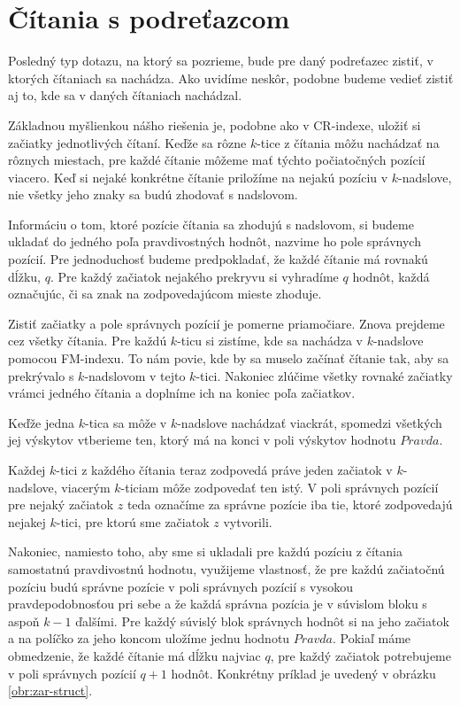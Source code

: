 \section{Čítania s podreťazcom}

Posledný typ dotazu, na ktorý sa pozrieme, bude pre daný podreťazec zistiť, v
ktorých čítaniach sa nachádza. Ako uvidíme neskôr, podobne budeme vedieť zistiť
aj to, kde sa v daných čítaniach nachádzal.

Základnou myšlienkou nášho riešenia je, podobne ako v CR-indexe, uložiť si
začiatky jednotlivých čítaní. Keďže sa rôzne $k$-tice z čítania môžu nachádzať
na rôznych miestach, pre každé čítanie môžeme mať týchto počiatočných pozícií viacero.
Keď si nejaké konkrétne čítanie priložíme na nejakú pozíciu v $k$-nadslove,
nie všetky jeho znaky sa budú zhodovať s nadslovom.

Informáciu o tom, ktoré pozície čítania sa zhodujú s nadslovom, si budeme ukladať
do jedného poľa pravdivostných hodnôt, nazvime ho pole správnych pozícií. Pre jednoduchosť budeme predpokladať, že
každé čítanie má rovnakú dĺžku, $q$. Pre každý začiatok nejakého prekryvu si
vyhradíme $q$ hodnôt, každá označujúc, či sa znak na zodpovedajúcom mieste zhoduje.

Zistiť začiatky a pole správnych pozícií je pomerne priamočiare. Znova prejdeme cez všetky čítania. 
Pre každú $k$-ticu si zistíme, kde sa nachádza v $k$-nadslove pomocou FM-indexu.
To nám povie, kde by sa muselo začínať čítanie tak, aby sa prekrývalo s $k$-nadslovom
v tejto $k$-tici. Nakoniec zlúčime všetky rovnaké začiatky vrámci jedného čítania a
doplníme ich na koniec poľa začiatkov.

Keďže jedna $k$-tica sa môže v $k$-nadslove nachádzať viackrát, spomedzi všetkých
jej výskytov vtberieme ten, ktorý má na konci v poli výskytov hodnotu $Pravda$.

Každej $k$-tici z každého čítania teraz zodpovedá práve jeden začiatok v $k$-nadslove,
viacerým $k$-ticiam môže zodpovedať ten istý. V poli správnych pozícií pre nejaký začiatok $z$
teda označíme za správne pozície iba tie, ktoré zodpovedajú nejakej $k$-tici, pre ktorú sme
začiatok $z$ vytvorili.

Nakoniec, namiesto toho, aby sme si ukladali pre každú pozíciu z čítania samostatnú pravdivostnú
hodnotu, využijeme vlastnosť, že pre každú začiatočnú pozíciu budú
správne pozície v poli správnych pozícií s vysokou pravdepodobnosťou pri sebe a že každá správna pozícia je
v súvislom bloku s aspoň $k-1$ ďalšími. Pre každý súvislý blok správnych hodnôt si
na jeho začiatok a na políčko za jeho koncom uložíme jednu hodnotu $Pravda$.
Pokiaľ máme obmedzenie, že každé čítanie má dĺžku najviac $q$, pre každý začiatok
potrebujeme v poli správnych pozícií $q+1$ hodnôt. Konkrétny príklad je uvedený v obrázku \ref{obr:zar-struct}.

